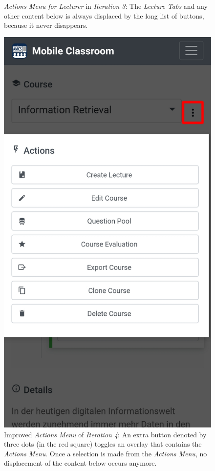 \begin{figure}
\begin{minipage}[t]{.5\textwidth}
		\captionsetup{width=.8\linewidth}
		\caption{\emph{Actions Menu for Lecturer} in \emph{Iteration 3}: The \emph{Lecture Tabs} and any other content below is always displaced by the long list of buttons, because it never disappears. }
		\label{fig:main_view_course_options_bad}
	\end{minipage}%
	\begin{minipage}[t]{.5\textwidth}
		\centering
		\includegraphics[width=0.95\linewidth]{screenshots/redesign/main_view_iteration_4_actions.jpg}
		\captionsetup{width=.8\linewidth}
		\caption{Improved \emph{Actions Menu} of \emph{Iteration 4}: An extra button denoted by three dots (in the red square) toggles an overlay that contains the \emph{Actions Menu}. Once a selection is made from the \emph{Actions Menu}, no displacement of the content below occurs anymore.}
		\label{fig:main_view_course_options_good}
	\end{minipage}
\end{figure}



